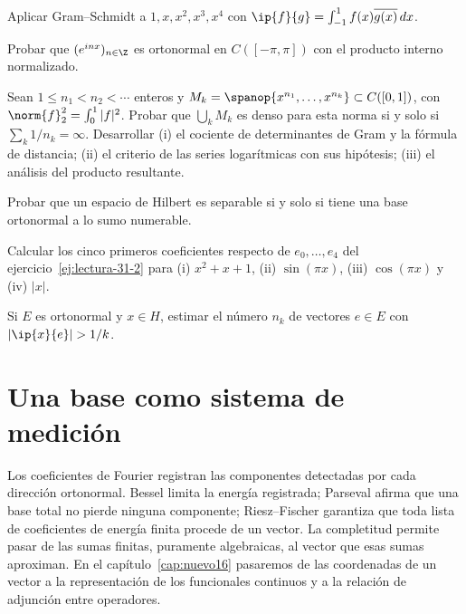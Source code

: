 \begin{ejercicio}\label{ej:lectura-31-2}
Aplicar Gram--Schmidt a $1,x,x^{2},x^{3},x^{4}$ con $\ip{f}{g}=\int_{-1}^{1}f(x)\overline{g(x)}\,dx$.
\end{ejercicio}


\begin{ejercicio}\label{ej:lectura-31-3}
Probar que $(e^{inx})_{n\in\Z}$ es ortonormal en $C([-\pi,\pi])$ con el producto interno normalizado.
\end{ejercicio}


\begin{ejercicio}\label{ej:lectura-31-4}
Sean $1\leq n_1<n_2<\cdots$ enteros y $M_k=\spanop\{x^{n_1},\dots,x^{n_k}\}\subset C([0,1])$, con $\norm{f}_2^{2}=\int_0^1|f|^{2}$. Probar que $\bigcup_kM_k$ es denso para esta norma si y solo si $\sum_k1/n_k=\infty$. Desarrollar (i) el cociente de determinantes de Gram y la fórmula de distancia; (ii) el criterio de las series logarítmicas con sus hipótesis; (iii) el análisis del producto resultante.
\end{ejercicio}


\begin{ejercicio}\label{ej:lectura-31-5}
Probar que un espacio de Hilbert es separable si y solo si tiene una base ortonormal a lo sumo numerable.
\end{ejercicio}


\begin{ejercicio}\label{ej:lectura-31-6}
Calcular los cinco primeros coeficientes respecto de $e_0,\dots,e_4$ del ejercicio~\ref{ej:lectura-31-2} para (i) $x^2+x+1$, (ii) $\sin(\pi x)$, (iii) $\cos(\pi x)$ y (iv) $|x|$.
\end{ejercicio}


\begin{ejercicio}\label{ej:lectura-31-7}
Si $E$ es ortonormal y $x\in H$, estimar el número $n_k$ de vectores $e\in E$ con $|\ip{x}{e}|>1/k$.
\end{ejercicio}


\section{Una base como sistema de medición}
Los coeficientes de Fourier registran las componentes detectadas por cada dirección ortonormal. Bessel limita la energía registrada; Parseval afirma que una base total no pierde ninguna componente; Riesz--Fischer garantiza que toda lista de coeficientes de energía finita procede de un vector. La completitud permite pasar de las sumas finitas, puramente algebraicas, al vector que esas sumas aproximan. En el capítulo~\ref{cap:nuevo16} pasaremos de las coordenadas de un vector a la representación de los funcionales continuos y a la relación de adjunción entre operadores.

